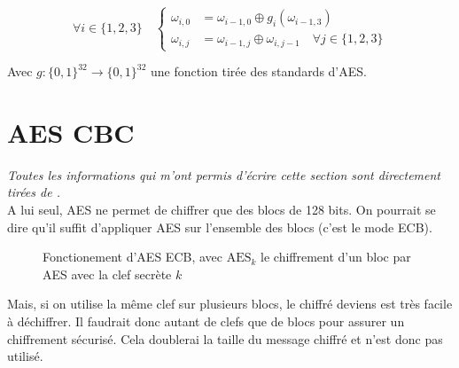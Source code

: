 \documentclass[a4paper, 12pt]{article}
\begin{document}
$$
\forall i \in \{1,2,3\} \quad 
\begin{cases}
	\omega_{i,0} &= \omega_{i-1,0} \oplus g_i(\omega_{i-1,3}) \\
	\omega_{i,j} &= \omega_{i-1,j} \oplus \omega_{i,j-1} \quad \forall j \in \{1,2,3\} 
\end{cases}
$$

\noindent Avec $g: \{0,1\}^{32} \rightarrow \{0,1\}^{32}$ une fonction tirée des standards d'AES.

\section{AES CBC}\label{sectioncbc}
\noindent\emph{Toutes les informations qui m'ont permis d'écrire cette section sont directement tirées de \cite{courscourt}.}\\

A lui seul, AES ne permet de chiffrer que des blocs de 128 bits. On pourrait se dire qu'il suffit d'appliquer AES sur l'ensemble des blocs (c'est le mode ECB). 

\begin{figure}[h]
\centering
{}
\caption{Fonctionement d'AES ECB, avec $\text{AES}_k$ le chiffrement d'un bloc par AES avec la clef secrète $k$}
\label{ilu_ECB}
\end{figure}

Mais, si on utilise la même clef sur plusieurs blocs, le chiffré deviens est très facile à déchiffrer. Il faudrait donc autant de clefs que de blocs pour assurer un chiffrement sécurisé. Cela doublerai la taille du message chiffré et n'est donc pas utilisé. \\
\end{document}
